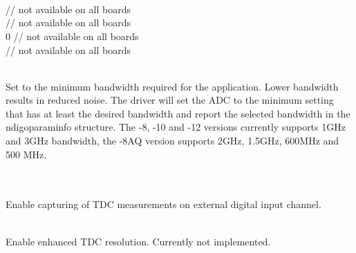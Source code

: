 			\\
			\\
			\\
			\\
			\\
			\\
			\\
			\\
			\\
			\\
			\\
			\\
			\\
			 // not available on all boards\\
			 // not available on all boards\\
			0 // not available on all boards\\
			 // not available on all boards\par

			\\
			Set to the minimum bandwidth required for the application. Lower bandwidth results in reduced noise. The driver will set the ADC to the minimum setting that has at least the desired bandwidth and report the selected bandwidth in the \textsf{ndigo\tu param\tu info} structure. The -8, -10 and -12 versions currently supports 1GHz and 3GHz bandwidth, the -8AQ version supports 2GHz, 1.5GHz, 600MHz and 500 MHz.\par

			\\
			\\
			Enable capturing of TDC measurements on external digital input channel.\par
			
			\\
			Enable enhanced TDC resolution. Currently not implemented.\par

